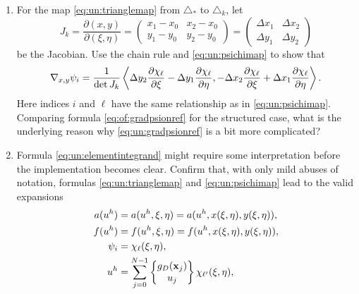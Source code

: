 \renewcommand{\labelenumi}{\arabic{chapter}.\arabic{enumi}\quad}
\renewcommand{\labelenumii}{(\alph{enumii})}
\begin{enumerate}
\item  \label{exer:un:gradientdetails}  For the map \eqref{eq:un:trianglemap} from $\triangle_\ast$ to $\triangle_k$, let
    $$J_k = \frac{\partial (x,y)}{\partial (\xi,\eta)} = \begin{pmatrix}
    x_1 - x_0 & x_2 - x_0 \\
    y_1 - y_0 & y_2 - y_0 \end{pmatrix}
    = \begin{pmatrix}
    \Delta x_1 & \Delta x_2 \\
    \Delta y_1 & \Delta y_2
    \end{pmatrix}$$
be the Jacobian.  Use the chain rule and \eqref{eq:un:psichimap} to show that
\begin{equation}
\nabla_{x,y} \psi_i = \frac{1}{\det J_k} \left<\Delta y_2 \frac{\partial \chi_\ell}{\partial \xi} - \Delta y_1 \frac{\partial \chi_\ell}{\partial \eta}, - \Delta x_2 \frac{\partial \chi_\ell}{\partial \xi} + \Delta x_1 \frac{\partial \chi_\ell}{\partial \eta}\right>. \label{eq:un:gradpsionref}
\end{equation}
Here indices $i$ and $\ell$ have the same relationship as in \eqref{eq:un:psichimap}.  Comparing formula \eqref{eq:of:gradpsionref} for the structured case, what is the underlying reason why \eqref{eq:un:gradpsionref} is a bit more complicated?  %
\item  \label{exer:un:elementintegranddetails}  Formula \eqref{eq:un:elementintegrand} might require some interpretation before the implementation becomes clear.  Confirm that, with only mild abuses of notation, formulas \eqref{eq:un:trianglemap} and \eqref{eq:un:psichimap} lead to the valid expansions
\begin{align*}
a(u^h) &= a(u^h,\xi,\eta) = a(u^h,x(\xi,\eta),y(\xi,\eta)), \\
f(u^h) &= f(u^h,\xi,\eta) = f(u^h,x(\xi,\eta),y(\xi,\eta)), \\
\psi_i &= \chi_{\ell}(\xi,\eta), \\
u^h &= \sum_{j=0}^{N-1} \left\{\begin{matrix} g_D(\bx_j) \\ u_j \end{matrix}\right\} \chi_{\ell'}(\xi,\eta), \\

\end{align*}
\end{enumerate}
